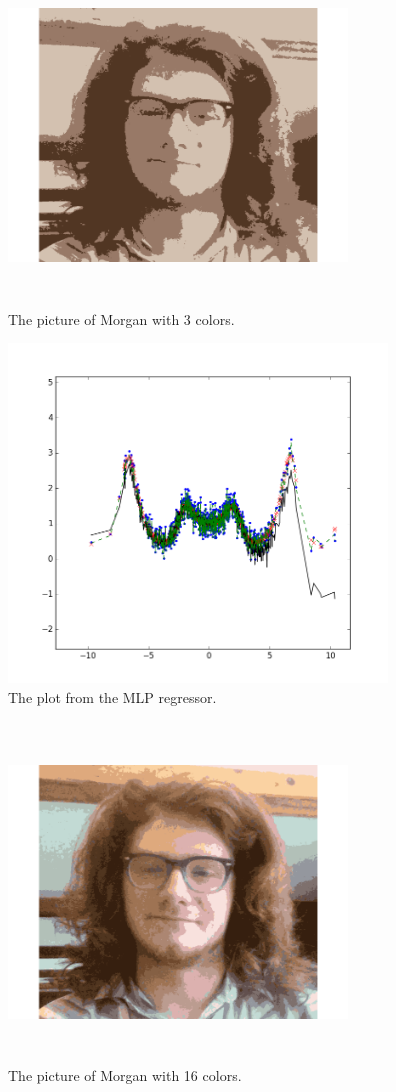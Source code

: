 \documentclass[a4paper]{article}
\begin{document}
\begin{figure}
  \includegraphics[width=9cm,height=9cm]{3colors.png}
  \caption{The picture of Morgan with 3 colors.}
  \label{fig:figure_2}
\end{figure}
\begin{figure}
  \includegraphics[width=\linewidth,height=9cm]{testwith1k.png}
  \caption{The plot from the MLP regressor.}
  \label{fig:figure_4}
\end{figure}
\begin{figure}
  \includegraphics[width=9cm,height=9cm]{n=16.png}
  \caption{The picture of Morgan with 16 colors.}
  \label{fig:figure_5}
\end{figure}
\end{document}
